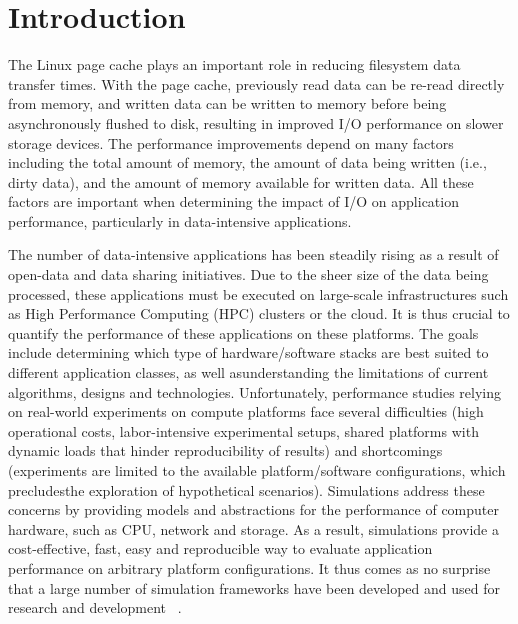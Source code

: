 \chapter{Introduction}
\label{introduction}

The Linux page cache plays an important role in reducing filesystem data 
transfer times. With the page cache, previously read data can be re-read 
directly from memory, and written data can be written to memory before 
being asynchronously flushed to disk, resulting in improved I/O performance
on slower storage devices. The performance improvements depend on many 
factors including the total amount of memory, the amount of data being 
written (i.e., dirty data), and the amount of memory available for
written data. All these factors are important when determining the impact 
of I/O on application performance, particularly in data-intensive applications.

The number of data-intensive applications has been steadily rising as a result of
open-data and data sharing initiatives. Due to the sheer size of the data being
processed, these applications must be executed on large-scale infrastructures
such as High Performance Computing (HPC) clusters or the cloud.  
It is thus crucial to quantify the performance of these applications
on these platforms. The goals include determining which type of hardware/software
stacks are best suited to different application classes, as well asunderstanding 
the limitations of current algorithms, designs and technologies. 
Unfortunately, performance studies relying on real-world experiments on 
compute platforms face several difficulties (high operational costs, 
labor-intensive experimental setups, shared platforms with dynamic loads 
that hinder reproducibility of results) and shortcomings
(experiments are limited to the available platform/software configurations, 
which precludesthe exploration of hypothetical scenarios). 
Simulations address these concerns by providing models and abstractions 
for the performance of computer hardware, such as CPU, network and storage. 
As a result, simulations provide a cost-effective, fast, easy and reproducible 
way to evaluate application performance on arbitrary platform configurations. 
It thus comes as no surprise that a large number of simulation frameworks 
have been developed and used for research and development
~\cite{ optorsim, gridsim, groudsim, cloudsim, nunez2012simcan,
nunez2012icancloud, mdcsim, dissect_cf, cloudnetsimplusplus, fognetsimplusplus, casanova2014simgrid, ROSS, casanova2020fgcs}. 

